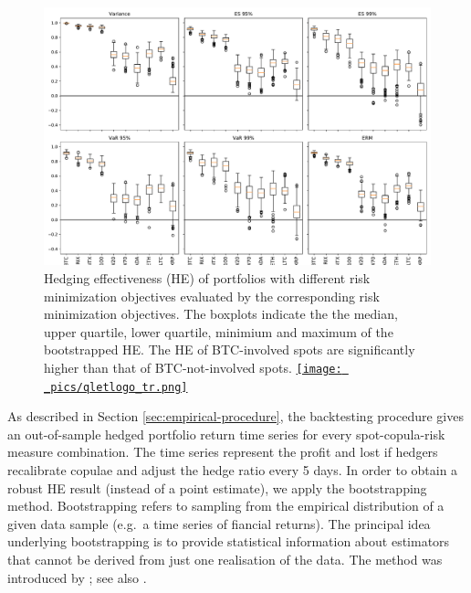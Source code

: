 \begin{figure}[t]
  \includegraphics[width=\textwidth]{_pics/HE_boxplot.pdf}
    \caption{Hedging effectiveness (HE) of portfolios with different risk minimization objectives evaluated by the corresponding risk minimization objectives.
              The boxplots indicate the the median, upper quartile, lower quartile, minimium and maximum of the bootstrapped HE.
              The HE of BTC-involved spots are significantly higher than that of BTC-not-involved spots.
    \href{http://www.quantlet.com/}{\texttt{[image: \_pics/qletlogo\_tr.png]}} }
  \label{fig:HEboxplot}
  \end{figure}



As described in Section \ref{sec:empirical-procedure}, the backtesting procedure gives
an out-of-sample hedged portfolio return time series for every spot-copula-risk measure combination. 
The time series represent the profit and lost if hedgers recalibrate copulae and adjust the hedge ratio every 5 days.  
In order to obtain a robust HE result (instead of a point estimate), we apply the bootstrapping method.
Bootstrapping refers to sampling from the empirical distribution of a
given data sample (e.g.\ a time series of fiancial returns). The
principal idea underlying bootstrapping is to provide statistical
information about estimators that cannot be derived from just one
realisation of the data. The method was introduced by
\cite{Efron1979}; see also \citep{efron1994introduction, davison1997bootstrap}. 


